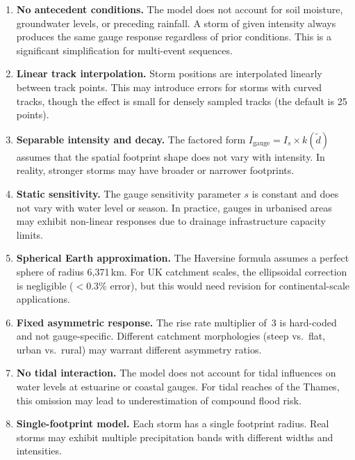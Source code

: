 \documentclass[11pt,a4paper]{article}
\begin{document}
\begin{enumerate}[nosep]
    \item \textbf{No antecedent conditions.} The model does not account for soil
          moisture, groundwater levels, or preceding rainfall. A storm of given
          intensity always produces the same gauge response regardless of prior
          conditions. This is a significant simplification for multi-event
          sequences.

    \item \textbf{Linear track interpolation.} Storm positions are interpolated
          linearly between track points. This may introduce errors for storms
          with curved tracks, though the effect is small for densely sampled
          tracks (the default is 25 points).

    \item \textbf{Separable intensity and decay.} The factored form
          $I_{\text{gauge}} = I_s \times k(\tilde{d})$ assumes that the spatial
          footprint shape does not vary with intensity. In reality, stronger
          storms may have broader or narrower footprints.

    \item \textbf{Static sensitivity.} The gauge sensitivity parameter $s$ is
          constant and does not vary with water level or season. In practice,
          gauges in urbanised areas may exhibit non-linear responses due to
          drainage infrastructure capacity limits.

    \item \textbf{Spherical Earth approximation.} The Haversine formula assumes
          a perfect sphere of radius 6,371\,km. For UK catchment scales, the
          ellipsoidal correction is negligible ($<$0.3\% error), but this would
          need revision for continental-scale applications.

    \item \textbf{Fixed asymmetric response.} The rise rate multiplier of~3 is
          hard-coded and not gauge-specific. Different catchment morphologies
          (steep vs.\ flat, urban vs.\ rural) may warrant different asymmetry
          ratios.

    \item \textbf{No tidal interaction.} The model does not account for tidal
          influences on water levels at estuarine or coastal gauges. For tidal
          reaches of the Thames, this omission may lead to underestimation of
          compound flood risk.

    \item \textbf{Single-footprint model.} Each storm has a single footprint
          radius. Real storms may exhibit multiple precipitation bands with
          different widths and intensities.
\end{enumerate}
\end{document}
